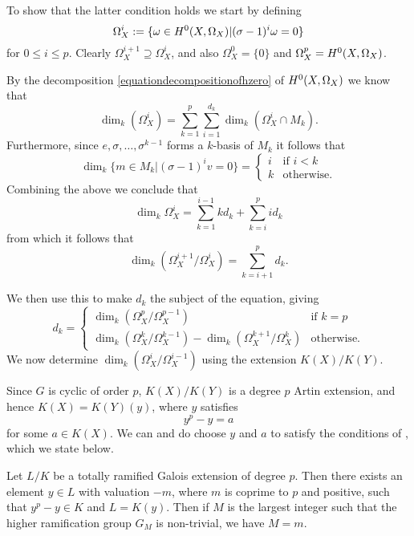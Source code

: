 To show that the latter condition holds we start by defining
    \[
    \Omega_X^i := \{ \omega \in {H^0(X,\Omega_X)} | (\sigma - 1)^i\omega = 0 \}
    \]
for $0 \leq i \leq p$.
Clearly $\Omega_X^{i+1} \supseteq \Omega_X^i$, and also $\Omega_X^0 = \{0\}$ and $\Omega_X^p = {H^0(X,\Omega_X)}$.

By the decomposition \eqref{equationdecompositionofhzero} of ${H^0(X,\Omega_X)}$ we know that
    \[
    \dim_k \left( \Omega_X^i\right) = \sum_{k=1}^p \sum_{i=1}^{d_k} \dim_k \left( \Omega_X^i \cap M_k \right).
    \]
Furthermore, since $e, \sigma, \ldots, \sigma^{k-1}$ forms a $k$-basis of $M_k$ it follows that 
    \[
    \dim_k\{ m \in M_k |(\sigma - 1)^iv = 0 \} = 
        \begin{cases}
        i & \text{if } i < k \\
        k & \text{otherwise.}
        \end{cases}
     \]   
Combining the above we conclude that 
    \[
    \dim_k \Omega_X^i = \sum_{k=1}^{i-1} kd_k + \sum_{k=i}^p id_k
    \]
from which it follows that
    \[
    \dim_k \left( \Omega_X^{i+1}/\Omega_X^i \right) = \sum_{k=i+1}^p d_k.
    \]


We then use this to make $d_k$ the subject of the equation, giving
    \[
    d_k = 
        \begin{cases}
        \dim_k \left( \Omega_X^p/\Omega_X^{p-1} \right) & \text{if } k = p \\
        \dim_k \left( \Omega_X^k/\Omega_X^{k-1} \right) - \dim_k \left( \Omega_X^{k+1}/\Omega_X^k \right) & \text{otherwise.}
        \end{cases}
    \]
We now determine $\dim_k\left( \Omega_X^i/\Omega_X^{i-1} \right)$ using the extension $K(X)/K(Y)$.

Since $G$ is cyclic of order $p$, $K(X)/K(Y)$ is a degree $p$ Artin extension, and hence $K(X) = K(Y)(y)$, where $y$ satisfies
    \[
    y^p - y = a
    \]
for some $a \in K(X)$.
We can and do choose $y$ and $a$ to satisfy the conditions of \cite[App.\ 5, Lem.\ 5.1]{quaddiffequi}, which we state below.

    \begin{lem}
    Let $L/K$ be a totally ramified Galois extension of degree $p$.
    Then there exists an element $y \in L$ with valuation $-m$, where $m$ is coprime to $p$ and positive, such that $y^p - y \in K$ and $L = K(y)$.
    Then if $M$ is the largest integer such that the higher ramification group $G_M$ is non-trivial, we have $M = m$.
    \end{lem}

